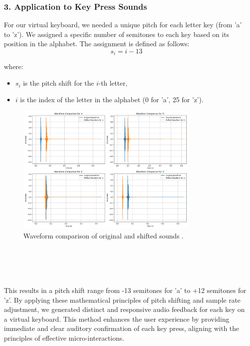 \subsubsection*{3. Application to Key Press Sounds}
For our virtual keyboard, we needed a unique pitch for each letter key (from 'a' to 'z'). We assigned a specific number of semitones to each key based on its position in the alphabet. The assignment is defined as follows:
\begin{equation}
s_i = i - 13
\end{equation}

where:
\begin{itemize}
  \item \( s_i \) is the pitch shift for the \( i \)-th letter,
  \item \( i \) is the index of the letter in the alphabet (0 for 'a', 25 for 'z').
\end{itemize}

\begin{figure}[h!]
\centering
\includegraphics[width=0.8\textwidth]{Development/waveform_comparison_combined.png}
\caption{Waveform comparison of original and shifted sounds .}
\end{figure} 
\noindent \\\\\ \\ \\ 
This results in a pitch shift range from -13 semitones for 'a' to +12 semitones for 'z'.
By applying these mathematical principles of pitch shifting and sample rate adjustment, we generated distinct and responsive audio feedback for each key on a virtual keyboard. This method enhances the user experience by providing immediate and clear auditory confirmation of each key press, aligning with the principles of effective micro-interactions.


